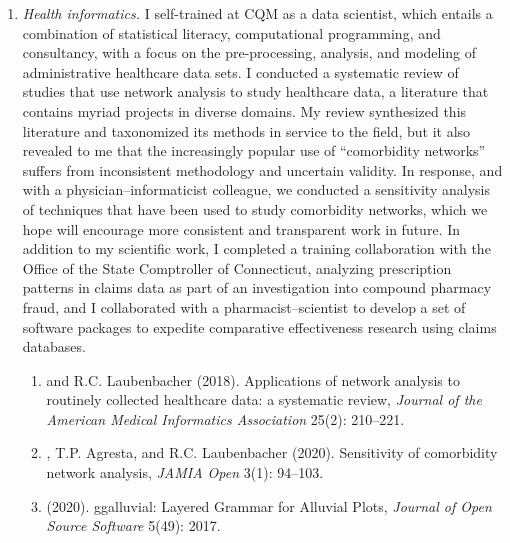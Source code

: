 \documentclass{nihbiosketch}
\begin{document}
\begin{enumerate}
\item \emph{Health informatics.}
I self-trained at CQM as a data scientist, which entails a combination of statistical literacy, computational programming, and consultancy, with a focus on the pre-processing, analysis, and modeling of administrative healthcare data sets.
I conducted a systematic review of studies that use network analysis to study healthcare data, a literature that contains myriad projects in diverse domains. My review synthesized this literature and taxonomized its methods in service to the field, but it also revealed to me that the increasingly popular use of ``comorbidity networks'' suffers from inconsistent methodology and uncertain validity. In response, and with a physician--informaticist colleague, we conducted a sensitivity analysis of techniques that have been used to study comorbidity networks, which we hope will encourage more consistent and transparent work in future.
In addition to my scientific work, I completed a training collaboration with the Office of the State Comptroller of Connecticut, analyzing prescription patterns in claims data as part of an investigation into compound pharmacy fraud, and I collaborated with a pharmacist--scientist to develop a set of software packages to expedite comparative effectiveness research using claims databases.

\begin{enumerate}
\item {} and R.C. Laubenbacher (2018). Applications of network analysis to routinely collected healthcare data: a systematic review, \emph{Journal of the American Medical Informatics Association} 25(2): 210--221.
\item {}, T.P. Agresta, and R.C. Laubenbacher (2020). Sensitivity of comorbidity network analysis, \emph{JAMIA Open} 3(1): 94--103.
\item {} (2020). ggalluvial: Layered Grammar for Alluvial Plots, \emph{Journal of Open Source Software} 5(49): 2017.
\end{enumerate}


\end{enumerate}
\end{document}
